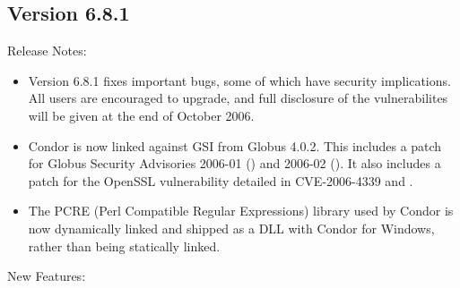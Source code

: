 \subsection*{\label{sec:New-6-8-1}Version 6.8.1}

\noindent Release Notes:

\begin{itemize}

\item Version 6.8.1 fixes important bugs, some of which have
security implications.  All users are encouraged to upgrade, and full
disclosure of the vulnerabilites will be given at the end of October 2006.

\item Condor is now linked against GSI from Globus 4.0.2. This includes
a patch for Globus Security Advisories 2006-01 
()
and 2006-02 
().
It also includes a
patch for the OpenSSL vulnerability detailed in CVE-2006-4339 and
.

\item The PCRE (Perl Compatible Regular Expressions) library used by
Condor is now dynamically linked and shipped as a DLL with Condor for
Windows, rather than being statically linked.

\end{itemize}


\noindent New Features:

